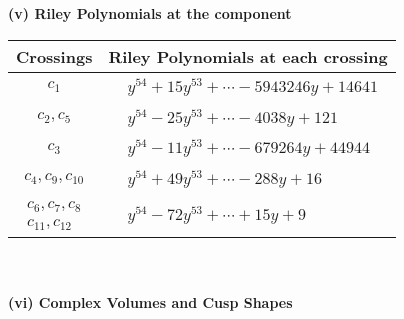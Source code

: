 \documentclass[1p]{elsarticle_modified}
\theoremstyle{definition}
\begin{document}
\newpage\renewcommand{\arraystretch}{1}
\flushleft \textbf{(v) Riley Polynomials at the component}\newline \\
\begin{tabular}{m{50pt}|m{274pt}}
Crossings & \hspace{64pt}Riley Polynomials at each crossing \\
\hline $$\begin{aligned}c_{1}\end{aligned}$$&$\begin{aligned}
&y^{54}+15 y^{53}+\cdots-5943246 y+14641
\end{aligned}$\\
\hline $$\begin{aligned}c_{2},c_{5}\end{aligned}$$&$\begin{aligned}
&y^{54}-25 y^{53}+\cdots-4038 y+121
\end{aligned}$\\
\hline $$\begin{aligned}c_{3}\end{aligned}$$&$\begin{aligned}
&y^{54}-11 y^{53}+\cdots-679264 y+44944
\end{aligned}$\\
\hline $$\begin{aligned}c_{4},c_{9},c_{10}\end{aligned}$$&$\begin{aligned}
&y^{54}+49 y^{53}+\cdots-288 y+16
\end{aligned}$\\
\hline $$\begin{aligned}c_{6},c_{7},c_{8}\\c_{11},c_{12}\end{aligned}$$&$\begin{aligned}
&y^{54}-72 y^{53}+\cdots+15 y+9
\end{aligned}$\\
\hline
\end{tabular}\\~\\
\newpage\flushleft \textbf{(vi) Complex Volumes and Cusp Shapes}
\end{document}
